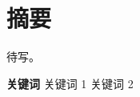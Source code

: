 \chapter{摘要}

待写。

{
    \vspace{1em}
    \setlength{\parindent}{0em}
    \textbf{关键词} \; 关键词 1 \; 关键词 2 \par
}
